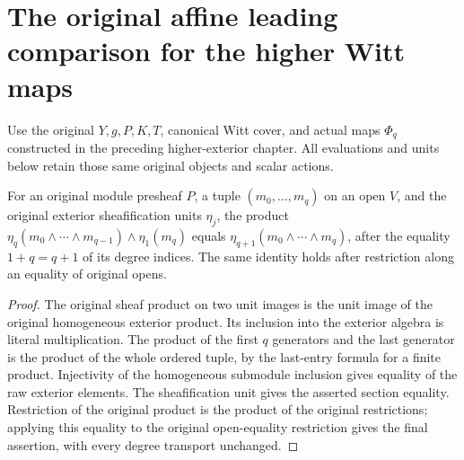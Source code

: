 \section{The original affine leading comparison for the higher Witt maps}

Use the original $Y,g,P,K,T$, canonical Witt cover, and actual maps $\Phi_q$
constructed in the preceding higher-exterior chapter. All evaluations and units
below retain those same original objects and scalar actions.

\begin{lemma}
\label{lem:di-higher-exterior-unit-product}
\leanok
For an original module presheaf $P$, a tuple $(m_0,\ldots,m_q)$ on an open
$V$, and the original exterior sheafification units $\eta_j$, the product
$\eta_q(m_0\wedge\cdots\wedge m_{q-1})\wedge\eta_1(m_q)$ equals
$\eta_{q+1}(m_0\wedge\cdots\wedge m_q)$, after the equality
$1+q=q+1$ of its degree indices. The same identity holds after restriction
along an equality of original opens.
\end{lemma}
\begin{proof}
\leanok
The original sheaf product on two unit images is the unit image of the
original homogeneous exterior product. Its inclusion into the exterior
algebra is literal multiplication. The product of the first $q$ generators
and the last generator is the product of the whole ordered tuple, by the
last-entry formula for a finite product. Injectivity of the homogeneous
submodule inclusion gives equality of the raw exterior elements. The
sheafification unit gives the asserted section equality. Restriction of
the original product is the product of the original restrictions; applying
this equality to the original open-equality restriction gives the final
assertion, with every degree transport unchanged.
\end{proof}


